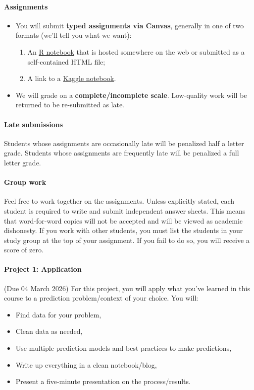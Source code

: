 \documentclass[10pt]{article}
\newcommand{\emf}[1]{\textbf{\textcolor{grass_green}{#1}}}
\begin{document}
\paragraph{Assignments}
\begin{itemize}
  \item You will submit \emf{typed assignments via Canvas}, generally in one of two formats (we'll tell you what we want):
  \begin{enumerate}
    \item An \href{https://www.rstudio.com/blog/r-notebooks/}{R notebook} that is hosted somewhere on the web or submitted as a self-contained HTML file;
    \item A link to a \href{https://www.kaggle.com/docs/notebooks}{Kaggle notebook}.
  \end{enumerate}
  \item We will grade on a \emf{complete/incomplete scale}. \newline Low-quality work will be returned to be re-submitted as late.
\end{itemize}

\paragraph{Late submissions} Students whose assignments are occasionally late will be penalized half a letter grade. Students whose assignments are frequently late will be penalized a full letter grade.

\paragraph{Group work} Feel free to work together on the assignments. Unless explicitly stated, each student is required to write and submit independent answer sheets. This means that word-for-word copies will not be accepted and will be viewed as academic dishonesty. If you work with other students, you must list the students in your study group at the top of your assignment. If you fail to do so, you will receive a score of zero.

\paragraph{Project 1: Application} (Due 04 March 2026) For this project, you will apply what you've learned in this course to a prediction problem/context of your choice. You will:
\begin{itemize}
  \item Find data for your problem,
  \item Clean data as needed,
  \item Use multiple prediction models and best practices to make predictions,
  \item Write up everything in a clean notebook/blog,
  \item Present a five-minute presentation on the process/results.
\end{itemize}
\end{document}

